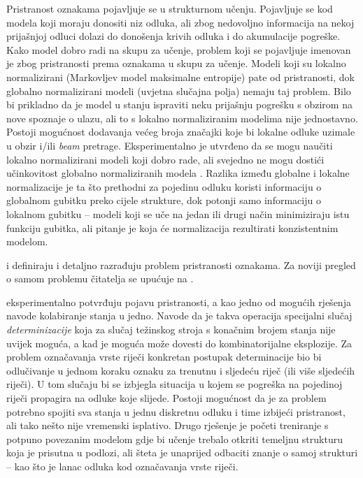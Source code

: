 Pristranost oznakama  pojavljuje se u strukturnom učenju.
Pojavljuje se kod modela koji moraju donositi niz odluka, ali zbog nedovoljno
informacija na nekoj prijašnjoj odluci dolazi do donošenja krivih odluka i do
akumulacije pogreške. Kako model dobro radi na skupu za učenje, problem koji se
pojavljuje imenovan je zbog pristranosti prema oznakama u skupu za učenje.
Modeli koji su lokalno normalizirani (Markovljev model maksimalne entropije)
pate od pristranosti, dok globalno normalizirani modeli (uvjetna slučajna polja)
nemaju taj problem. Bilo bi prikladno da je model u stanju ispraviti neku
prijašnju pogrešku s obzirom na nove spoznaje o ulazu, ali to s lokalno
normaliziranim modelima nije jednostavno. Postoji mogućnost dodavanja većeg
broja značajki koje bi lokalne odluke uzimale u obzir i/ili \textit{beam}
pretrage. Eksperimentalno je utvrđeno da se mogu naučiti lokalno normalizirani
modeli koji dobro rade, ali svejedno ne mogu dostići učinkovitost globalno
normaliziranih modela \citep{liang2008structure}. Razlika između globalne i
lokalne normalizacije je ta što prethodni za pojedinu odluku koristi informaciju
o globalnom gubitku preko cijele strukture, dok potonji samo informaciju o
lokalnom gubitku -- modeli koji se uče na jedan ili drugi način minimiziraju
istu funkciju gubitka, ali pitanje je koja će normalizacija rezultirati
konzistentnim modelom.

\citet*{lafferty2001conditional} i \citet*{leon1991approche} definiraju i
detaljno razrađuju problem pristranosti oznakama. Za noviji pregled o samom
problemu čitatelja se upućuje na \citep{andor2016globally}.

\citet*{lafferty2001conditional} eksperimentalno potvrđuju pojavu pristranosti,
a kao jedno od mogućih rješenja navode kolabiranje stanja u jedno. Navode da je
takva operacija specijalni slučaj \emph{determinizacije} koja za slučaj
težinskog stroja s konačnim brojem stanja nije uvijek moguća, a kad je moguća
može dovesti do kombinatorijalne eksplozije. Za problem označavanja vrste riječi
konkretan postupak determinacije bio bi odlučivanje u jednom koraku oznaku za
trenutnu i sljedeću riječ (ili više sljedećih riječi). U tom slučaju bi se
izbjegla situacija u kojem se pogreška na pojedinoj riječi propagira na odluke
koje slijede. Postoji mogućnost da je za problem potrebno spojiti sva stanja u
jednu diskretnu odluku i time izbijeći pristranost, ali tako nešto nije
vremenski isplativo. Drugo rješenje je početi treniranje s potpuno povezanim
modelom gdje bi učenje trebalo otkriti temeljnu strukturu koja je prisutna u
podlozi, ali šteta je unaprijed odbaciti znanje o samoj strukturi -- kao što je
lanac odluka kod označavanja vrste riječi.

